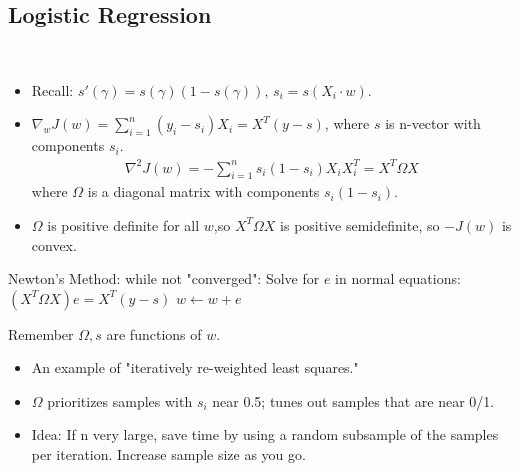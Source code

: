 \documentclass[10pt]{article}
\begin{document}
		\subsection*{Logistic Regression}
			\
			\begin{itemize}
				\item Recall: $s'(\gamma) = s(\gamma)(1 - s(\gamma))$, $s_{i} = s(X_{i}\cdot w)$.
				\item $\nabla_{w}J(w) = \sum_{i=1}^{n}(y_{i} - s_{i})X_{i} = X^{T}(y - s)$, where $s$ is n-vector with components $s_{i}$.
					\begin{align*}
						\nabla^{2}J(w) = -\sum_{i=1}^{n}s_{i}(1 - s_{i})X_{i}X_{i}^{T} = X^{T}\Omega X
					\end{align*}
				where $\Omega$ is a diagonal matrix with components $s_{i}(1 - s_{i})$.
				\item $\Omega$ is positive definite for all $w$,so $X^{T}\Omega X$ is positive semidefinite, so $-J(w)$ is convex.
				\end{itemize}
\begin{codeblock}
	Newton's Method:
	    while not "converged":
	        Solve for $e$ in normal equations: $(X^{T}\Omega X)e = X^{T}(y - s)$
	        $w \leftarrow w + e$
\end{codeblock}
				Remember $\Omega, s$ are functions of $w$.
				\begin{itemize}
				\item An example of "iteratively re-weighted least squares."
				\item $\Omega$ prioritizes samples with $s_{i}$ near 0.5; tunes out samples that are near 0/1.
				\item Idea: If n very large, save time by using a random subsample of the samples per iteration. Increase sample size as you go.
			\end{itemize}
			
\end{document}
